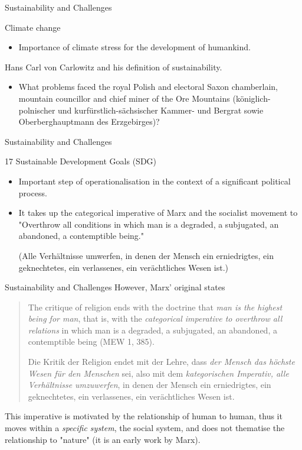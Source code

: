 \documentclass{beamer}
\title{Modelling Sustainable Systems\\ and Semantic Web\\[6pt]
  Systems and Sustainability
  \vskip1em}
\subtitle{Lecture in the Module 10-202-2312\\ for Master Computer Science}
\author{Prof. Dr. Hans-Gert Gräbe\\
\url{http://www.informatik.uni-leipzig.de/~graebe}}
\date{April 2022}
\begin{document}
{
\begin{frame}
  \titlepage
\end{frame}}

\begin{frame}{Sustainability and Challenges}

Climate change
\begin{itemize}
\item Importance of climate stress for the development of humankind.
\end{itemize}

Hans Carl von Carlowitz and his definition of sustainability.
\begin{itemize}
\item What problems faced the royal Polish and electoral Saxon chamberlain,
  mountain councillor and chief miner of the Ore Mountains
  (königlich-polnischer und kurfürstlich-sächsischer Kammer- und Bergrat sowie
  Oberberghauptmann des Erzgebirges)?
\end{itemize}
\end{frame}

\begin{frame}{Sustainability and Challenges}

  17 Sustainable Development Goals (SDG) 
\begin{itemize}
\item Important step of operationalisation in the context of a significant
  political process.
\item It takes up the categorical imperative of Marx and the socialist
  movement to "Overthrow all conditions in which man is a degraded, a
  subjugated, an abandoned, a contemptible being."\medskip

  (Alle Verhältnisse umwerfen, in denen der Mensch ein erniedrigtes, ein
  geknechtetes, ein verlassenes, ein verächtliches Wesen ist.)
\end{itemize}
\end{frame}

\begin{frame}{Sustainability and Challenges}
  However, Marx' original states
  \begin{quote}\rm
    The critique of religion ends with the doctrine that \emph{man is the
      highest being for man}, that is, with the \emph{categorical imperative
      to overthrow all relations} in which man is a degraded, a subjugated, an
    abandoned, a contemptible being (MEW 1, 385).\medskip

    Die Kritik der Religion endet mit der Lehre, dass \emph{der Mensch das
      höchste Wesen für den Menschen} sei, also mit dem \emph{kategorischen
      Imperativ, alle Verhältnisse umzuwerfen}, in denen der Mensch ein
    erniedrigtes, ein geknechtetes, ein verlassenes, ein verächtliches Wesen
    ist.
  \end{quote}
  This imperative is motivated by the relationship of human to human, thus it
  moves within a \emph{specific system}, the social system, and does not
  thematise the relationship to "nature" (it is an early work by Marx).
\end{frame}
\end{document}
